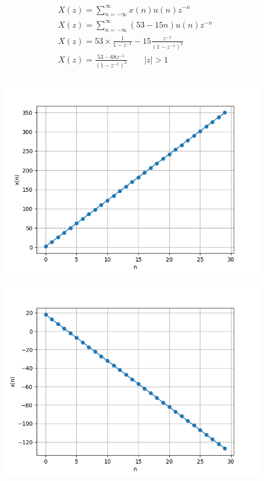 \documentclass[journal,12pt,twocolumn]{IEEEtran}
\theoremstyle{remark}
\begin{document}
\begin{enumerate}
\begin{align}
       &X(z) = \sum_{n=-\infty}^{\infty} x(n) u(n)z^{-n} \\
       &X(z) = \sum_{n=-\infty}^{\infty} (53 - 15n) u(n)z^{-n} \\
       &X(z)=53 \times \frac{1}{1-{z^{-1}}}- 15\frac{z^{-1}}{(1-{z^{-1}})^2}\\
       &X(z)=\frac{53-68{z^{-1}}}{(1-{z^{-1}})^2}\qquad|z|>1\\
\end{align}
\end{enumerate}

\begin{figure}[h]
       \vspace*{-1cm}
       \centering
        \includegraphics[width=0.8\linewidth]{figs/download.png} %
        \caption{}
\end{figure}

\begin{figure}[h]
      \vspace*{-1cm}
      \centering
       \includegraphics[width=0.8\linewidth]{figs/download (1).png} %
        \caption{}
    \end{figure}
    
\end{document}
